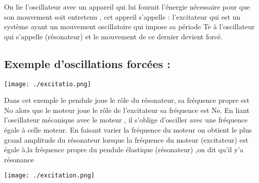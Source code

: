\documentclass[12pt]{article}
\begin{document}
On lie l'oscillateur avec un appareil qui lui fournit l'énergie nécessaire pour que son mouvement soit entretenu , cet appreil
s'appelle : l'excitateur qui est un système ayant un mouvement oscillatoire qui impose sa période Te à l'oscillateur qui s’appelle
(résonateur) et le mouvement de ce dernier devient forcé.

\subsection{Exemple d'oscillations forcées : }

\begin{center}
	\texttt{[image: ./excitatio.png]}
\end{center}



Dans cet exemple le pendule joue le rôle du résonateur, sa fréquence propre est No alors que le moteur joue le rôle de
l’excitateur sa fréquence est Ne.
En liant l’oscillateur mécanique avec le moteur , il s'oblige d'osciller avec une fréquence égale à celle moteur.
En faisant varier la fréquence du moteur on obtient le plus grand amplitude du résonateur lorsque la fréquence du moteur (excitateur) est égale à,la fréquence propre du pendule élastique (résonateur) ,on dit qu’il y’a résonance


\begin{center}

	\texttt{[image: ./excitation.png]}
\end{center}





\end{document}
